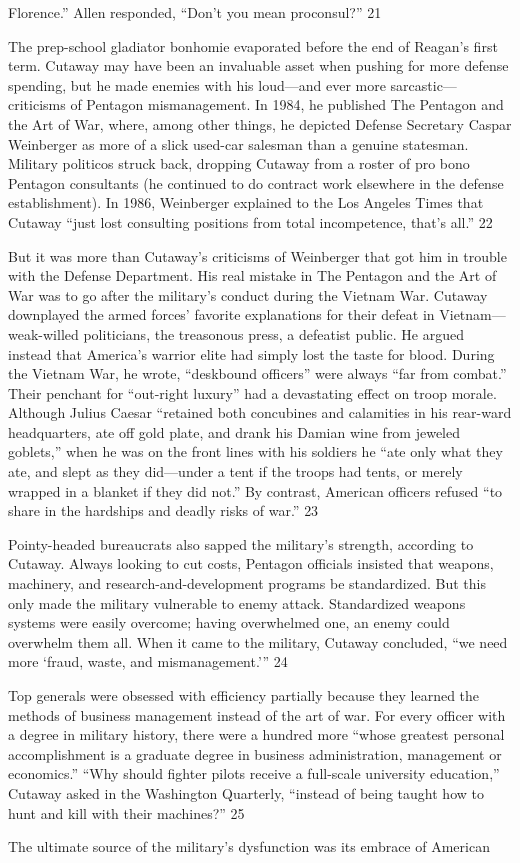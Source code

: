 Florence.” Allen responded, “Don’t you mean proconsul?” {\color{blue} 21 } {\par} The prep-school gladiator bonhomie evaporated before the end of Reagan’s first term. Cutaway may have been an invaluable asset when pushing for more defense spending, but he made enemies with his loud—and ever more sarcastic—criticisms of Pentagon mismanagement. In 1984, he published The Pentagon and the Art of War, where, among other things, he depicted Defense Secretary Caspar Weinberger as more of a slick used-car salesman than a genuine statesman. Military politicos struck back, dropping Cutaway from a roster of pro bono Pentagon consultants (he continued to do contract work elsewhere in the defense establishment). In 1986, Weinberger explained to the Los Angeles Times that Cutaway “just lost consulting positions from total incompetence, that’s all.” {\color{blue} 22 } {\par} But it was more than Cutaway’s criticisms of Weinberger that got him in trouble with the Defense Department. His real mistake in The Pentagon and the Art of War was to go after the military’s conduct during the Vietnam War. Cutaway downplayed the armed forces’ favorite explanations for their defeat in Vietnam—weak-willed politicians, the treasonous press, a defeatist public. He argued instead that America’s warrior elite had simply lost the taste for blood. During the Vietnam War, he wrote, “deskbound officers” were always “far from combat.” Their penchant for “out-right luxury” had a devastating effect on troop morale. Although Julius Caesar “retained both concubines and calamities in his rear-ward headquarters, ate off gold plate, and drank his Damian wine from jeweled goblets,” when he was on the front lines with his soldiers he “ate only what they ate, and slept as they did—under a tent if the troops had tents, or merely wrapped in a blanket if they did not.” By contrast, American officers refused “to share in the hardships and deadly risks of war.” {\color{blue} 23 } {\par} Pointy-headed bureaucrats also sapped the military’s strength, according to Cutaway. Always looking to cut costs, Pentagon officials insisted that weapons, machinery, and research-and-development programs be standardized. But this only made the military vulnerable to enemy attack. Standardized weapons systems were easily overcome; having overwhelmed one, an enemy could overwhelm them all. When it came to the military, Cutaway concluded, “we need more ‘fraud, waste, and mismanagement.’” {\color{blue} 24 } {\par} Top generals were obsessed with efficiency partially because they learned the methods of business management instead of the art of war. For every officer with a degree in military history, there were a hundred more “whose greatest personal accomplishment is a graduate degree in business administration, management or economics.” “Why should fighter pilots receive a full-scale university education,” Cutaway asked in the Washington Quarterly, “instead of being taught how to hunt and kill with their machines?” {\color{blue} 25 } {\par} The ultimate source of the military’s dysfunction was its embrace of American 